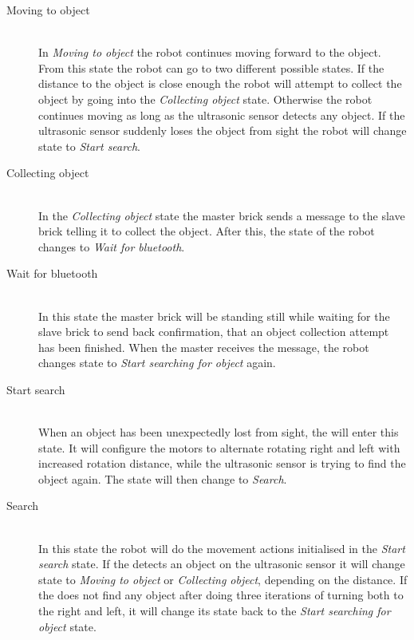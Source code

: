 \begin{description}
\item[Moving to object] \hfill \\
In \emph{Moving to object} the robot continues moving forward to the object. From this state the robot can go to two different possible states. If the distance to the object is close enough the robot will attempt to collect the object by going into the \emph{Collecting object} state. Otherwise the robot continues moving as long as the ultrasonic sensor detects any object. If the ultrasonic sensor suddenly loses the object from sight the robot will change state to \emph{Start search}.

\item[Collecting object] \hfill \\
In the \emph{Collecting object} state the master brick sends a message to the slave brick telling it to collect the object. After this, the state of the robot changes to \emph{Wait for bluetooth}.

\item[Wait for bluetooth] \hfill \\
In this state the master brick will be standing still while waiting for the slave brick to send back confirmation, that an object collection attempt has been finished. When the master receives the message, the robot changes state to \emph{Start searching for object} again. 

\item[Start search] \hfill \\
When an object has been unexpectedly lost from sight, the \projname{} will enter this state. It will configure the motors to alternate rotating right and left with increased rotation distance, while the ultrasonic sensor is trying to find the object again. The state will then change to \emph{Search}.

\item[Search] \hfill \\
In this state the robot will do the movement actions initialised in the \emph{Start search} state. If the \projname{} detects an object on the ultrasonic sensor it will change state to \emph{Moving to object} or \emph{Collecting object}, depending on the distance. If the \projname{} does not find any object after doing three iterations of turning both to the right and left, it will change its state back to the \emph{Start searching for object} state. 
\end{description}


